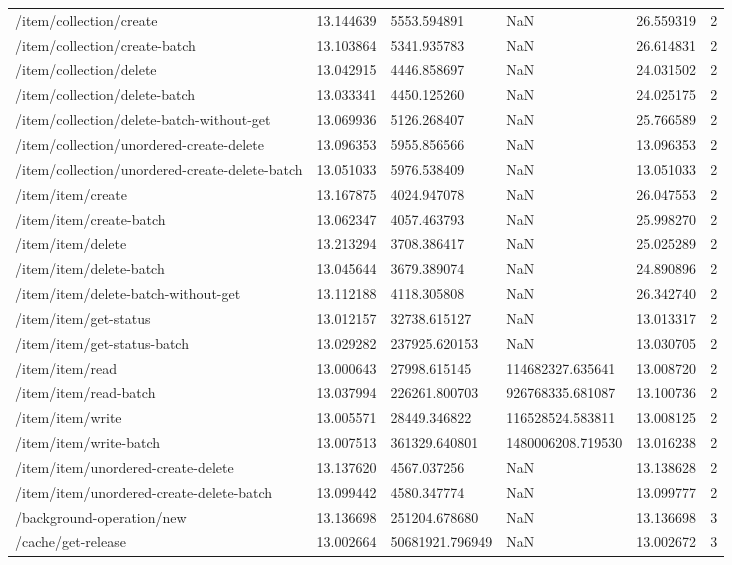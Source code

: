 \begin{tabularx}{\linewidth}{XXXXXX}
/item/collection/create & 13.144639 & 5553.594891 & NaN & 26.559319 & 2 \\
/item/collection/create-batch & 13.103864 & 5341.935783 & NaN & 26.614831 & 2 \\
/item/collection/delete & 13.042915 & 4446.858697 & NaN & 24.031502 & 2 \\
/item/collection/delete-batch & 13.033341 & 4450.125260 & NaN & 24.025175 & 2 \\
/item/collection/delete-batch-without-get & 13.069936 & 5126.268407 & NaN & 25.766589 & 2 \\
/item/collection/unordered-create-delete & 13.096353 & 5955.856566 & NaN & 13.096353 & 2 \\
/item/collection/unordered-create-delete-batch & 13.051033 & 5976.538409 & NaN & 13.051033 & 2 \\
/item/item/create & 13.167875 & 4024.947078 & NaN & 26.047553 & 2 \\
/item/item/create-batch & 13.062347 & 4057.463793 & NaN & 25.998270 & 2 \\
/item/item/delete & 13.213294 & 3708.386417 & NaN & 25.025289 & 2 \\
/item/item/delete-batch & 13.045644 & 3679.389074 & NaN & 24.890896 & 2 \\
/item/item/delete-batch-without-get & 13.112188 & 4118.305808 & NaN & 26.342740 & 2 \\
/item/item/get-status & 13.012157 & 32738.615127 & NaN & 13.013317 & 2 \\
/item/item/get-status-batch & 13.029282 & 237925.620153 & NaN & 13.030705 & 2 \\
/item/item/read & 13.000643 & 27998.615145 & 114682327.635641 & 13.008720 & 2 \\
/item/item/read-batch & 13.037994 & 226261.800703 & 926768335.681087 & 13.100736 & 2 \\
/item/item/write & 13.005571 & 28449.346822 & 116528524.583811 & 13.008125 & 2 \\
/item/item/write-batch & 13.007513 & 361329.640801 & 1480006208.719530 & 13.016238 & 2 \\
/item/item/unordered-create-delete & 13.137620 & 4567.037256 & NaN & 13.138628 & 2 \\
/item/item/unordered-create-delete-batch & 13.099442 & 4580.347774 & NaN & 13.099777 & 2 \\
/background-operation/new & 13.136698 & 251204.678680 & NaN & 13.136698 & 3 \\
/cache/get-release & 13.002664 & 50681921.796949 & NaN & 13.002672 & 3 \\

\end{tabularx}
